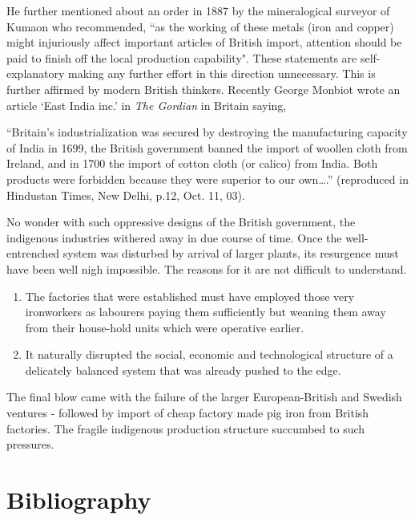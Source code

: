 He further mentioned about an order in 1887 by the mineralogical surveyor of Kumaon who recommended, “as the working of these metals (iron and copper) might injuriously affect important articles of British import, attention should be paid to finish off the local production capability". These statements are self-explanatory making any further effort in this direction unnecessary. This is further affirmed by modern British thinkers. Recently George Monbiot wrote an article ‘East India inc.’ in {\it The Gordian} in Britain saying, 

“Britain’s industrialization was secured by destroying the manufacturing capacity of India in 1699, the British government banned the import of woollen cloth from Ireland, and in 1700 the import of cotton cloth (or calico) from India. Both products were forbidden because they were superior to our own….” (reproduced in Hindustan Times, New Delhi, p.12, Oct. 11, 03). 

No wonder with such oppressive designs of the British government, the indigenous industries withered away in due course of time. Once the well-entrenched system was disturbed by arrival of larger plants, its resurgence must have been well nigh impossible. The reasons for it are not difficult to understand.

\begin{enumerate}
\item The factories that were established must have employed those very ironworkers as labourers paying them sufficiently but weaning them away from their house-hold units which were operative earlier.
\item It naturally disrupted the social, economic and technological structure of a delicately balanced system that was already pushed to the edge.
\end{enumerate}

The final blow came with the failure of the larger European-British and Swedish ventures - followed by import of cheap factory made pig iron from British factories. The fragile indigenous production structure succumbed to such pressures.


\newpage

\section*{Bibliography}

